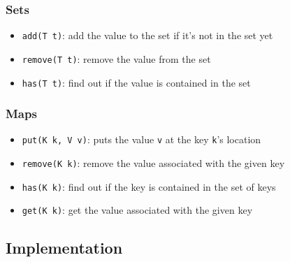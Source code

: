 \documentclass[
  10pt,
  english,
  letterpaper,
,tablecaptionabove
]{scrartcl}
\newcommand{\passthrough}[1]{#1}
\providecommand{\tightlist}{%
  \setlength{\itemsep}{0pt}\setlength{\parskip}{0pt}}
\begin{document}
\hypertarget{sets}{%
\subsubsection{Sets}\label{sets}}

\begin{itemize}
\tightlist
\item
  \passthrough{\lstinline!add(T t)!}: add the value to the set if it's
  not in the set yet
\item
  \passthrough{\lstinline!remove(T t)!}: remove the value from the set
\item
  \passthrough{\lstinline!has(T t)!}: find out if the value is contained
  in the set
\end{itemize}

\hypertarget{maps}{%
\subsubsection{Maps}\label{maps}}

\begin{itemize}
\tightlist
\item
  \passthrough{\lstinline!put(K k, V v)!}: puts the value
  \passthrough{\lstinline!v!} at the key \passthrough{\lstinline!k!}'s
  location
\item
  \passthrough{\lstinline!remove(K k)!}: remove the value associated
  with the given key
\item
  \passthrough{\lstinline!has(K k)!}: find out if the key is contained
  in the set of keys
\item
  \passthrough{\lstinline!get(K k)!}: get the value associated with the
  given key
\end{itemize}

\hypertarget{implementation}{%
\subsection{Implementation}\label{implementation}}
\end{document}
